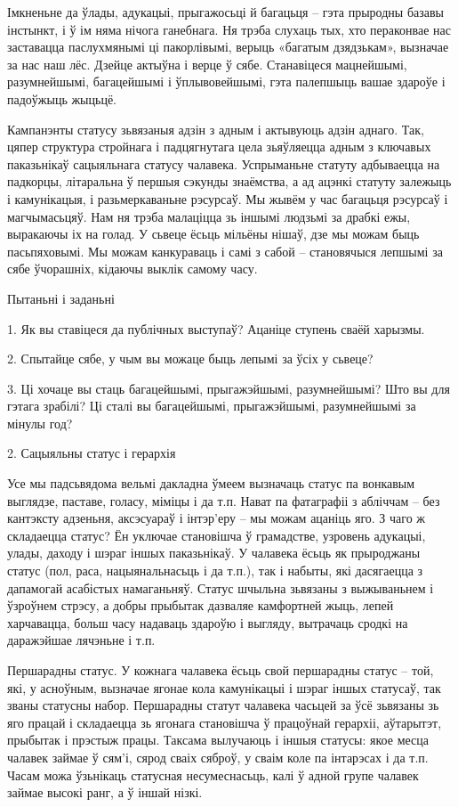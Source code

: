 Імкненьне да ўлады, адукацыі, прыгажосьці й багацьця – гэта прыродны базавы інстынкт, і ў ім няма нічога ганебнага. Ня трэба слухаць тых, хто пераконвае нас заставацца паслухмянымі ці пакорлівымі, верыць «багатым дзядзькам», вызначае за нас наш лёс. Дзейце актыўна і верце ў сябе. Станавіцеся мацнейшымі, разумнейшымі, багацейшымі і ўплывовейшымі, гэта палепшыць вашае здароўе і падоўжыць жыцьцё.

Кампанэнты статусу зьвязаныя адзін з адным і актывуюць адзін аднаго. Так, цяпер структура стройнага і падцягнутага цела зьяўляецца адным з ключавых паказьнікаў сацыяльнага статусу чалавека. Успрыманьне статуту адбываецца на падкорцы, літаральна ў першыя сэкунды знаёмства, а ад ацэнкі статуту залежыць і камунікацыя, і разьмеркаваньне рэсурсаў. Мы жывём у час багацьця рэсурсаў і магчымасьцяў. Нам ня трэба малаціцца зь іншымі людзьмі за драбкі ежы, выракаючы іх на голад. У сьвеце ёсьць мільёны нішаў, дзе мы можам быць пасьпяховымі. Мы можам канкураваць і самі з сабой – становячыся лепшымі за сябе ўчорашніх, кідаючы выклік самому часу.

Пытаньні і заданьні

1. Як вы ставіцеся да публічных выступаў? Ацаніце ступень сваёй харызмы.

2. Спытайце сябе, у чым вы можаце быць лепымі за ўсіх у сьвеце?

3. Ці хочаце вы стаць багацейшымі, прыгажэйшымі, разумнейшымі? Што вы для гэтага зрабілі? Ці сталі вы багацейшымі, прыгажэйшымі, разумнейшымі за мінулы год?


2. Сацыяльны статус і герархія

Усе мы падсьвядома вельмі дакладна ўмеем вызначаць статус па вонкавым выглядзе, паставе, голасу, міміцы і да т.п. Нават па фатаграфіі з абліччам – без кантэксту адзеньня, аксэсуараў і інтэр'еру – мы можам ацаніць яго. З чаго ж складаецца статус? Ён уключае становішча ў грамадстве, узровень адукацыі, улады, даходу і шэраг іншых паказьнікаў. У чалавека ёсьць як прыроджаны статус (пол, раса, нацыянальнасьць і да т.п.), так і набыты, які дасягаецца з дапамогай асабістых намаганьняў. Статус шчыльна зьвязаны з выжываньнем і ўзроўнем стрэсу, а добры прыбытак дазваляе камфортней жыць, лепей харчавацца, больш часу надаваць здароўю і выгляду, вытрачаць сродкі на даражэйшае лячэньне і т.п.

Першарадны статус. У кожнага чалавека ёсьць свой першарадны статус – той, які, у асноўным, вызначае ягонае кола камунікацыі і шэраг іншых статусаў, так званы статусны набор. Першарадны статут чалавека часьцей за ўсё зьвязаны зь яго працай і складаецца зь ягонага становішча ў працоўнай герархіі, аўтарытэт, прыбытак і прэстыж працы. Таксама вылучаюць і іншыя статусы: якое месца чалавек займае ў сям'і, сярод сваіх сяброў, у сваім коле па інтарэсах і да т.п. Часам можа ўзьнікаць статусная несумеснасьць, калі ў адной групе чалавек займае высокі ранг, а ў іншай нізкі.

